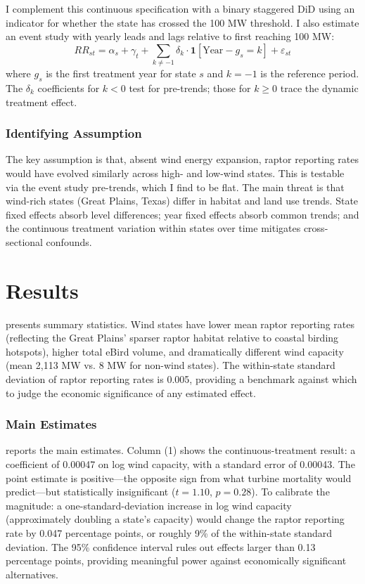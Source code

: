 \documentclass[12pt]{article}
\begin{document}
I complement this continuous specification with a binary staggered DiD using an indicator for whether the state has crossed the 100 MW threshold. I also estimate an event study with yearly leads and lags relative to first reaching 100 MW:
\begin{equation}
RR_{st} = \alpha_s + \gamma_t + \sum_{k \neq -1} \delta_k \cdot \mathbf{1}[\text{Year} - g_s = k] + \varepsilon_{st}
\end{equation}
where $g_s$ is the first treatment year for state $s$ and $k = -1$ is the reference period. The $\delta_k$ coefficients for $k < 0$ test for pre-trends; those for $k \geq 0$ trace the dynamic treatment effect.

\subsubsection*{Identifying Assumption} The key assumption is that, absent wind energy expansion, raptor reporting rates would have evolved similarly across high- and low-wind states. This is testable via the event study pre-trends, which I find to be flat. The main threat is that wind-rich states (Great Plains, Texas) differ in habitat and land use trends. State fixed effects absorb level differences; year fixed effects absorb common trends; and the continuous treatment variation within states over time mitigates cross-sectional confounds.

\section{Results}

 presents summary statistics. Wind states have lower mean raptor reporting rates (reflecting the Great Plains' sparser raptor habitat relative to coastal birding hotspots), higher total eBird volume, and dramatically different wind capacity (mean 2,113 MW vs. 8 MW for non-wind states). The within-state standard deviation of raptor reporting rates is 0.005, providing a benchmark against which to judge the economic significance of any estimated effect.

\subsubsection*{Main Estimates}  reports the main estimates. Column (1) shows the continuous-treatment result: a coefficient of 0.00047 on log wind capacity, with a standard error of 0.00043. The point estimate is positive---the opposite sign from what turbine mortality would predict---but statistically insignificant ($t = 1.10$, $p = 0.28$). To calibrate the magnitude: a one-standard-deviation increase in log wind capacity (approximately doubling a state's capacity) would change the raptor reporting rate by 0.047 percentage points, or roughly 9\% of the within-state standard deviation. The 95\% confidence interval rules out effects larger than 0.13 percentage points, providing meaningful power against economically significant alternatives.
\end{document}
